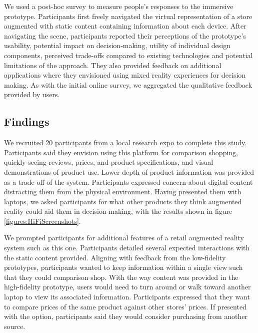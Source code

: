 We used a post-hoc survey to measure people's responses to the immersive prototype. Participants first freely navigated the virtual representation of a store augmented with static content containing information about each device. 
After navigating the scene, participants reported their perceptions of the prototype's usability, potential impact on decision-making, utility of individual design components, perceived trade-offs compared to existing technologies and potential limitations of the approach. They also provided feedback on additional applications where they envisioned using mixed reality experiences for decision making. As with the initial online survey, we aggregated the qualitative feedback provided by users.


\subsection{Findings}
We recruited 20 participants from a local research expo to complete this study. Participants said they envision using this platform for comparison shopping, quickly seeing reviews, prices, and product specifications, and visual demonstrations of product use. Lower depth of product information was provided as a trade-off of the system. Participants expressed concern about digital content distracting them from the physical environment. Having presented them with laptops, we asked participants for what other products they think augmented reality could aid them in decision-making, with the results shown in figure \ref{figures:HiFiScreenshots}.  

We prompted participants for additional features of a retail augmented reality system such as this one. Participants detailed several expected interactions with the static content provided. Aligning with feedback from the low-fidelity prototypes, participants wanted to keep information within a single view such that they could comparison shop. With the way content was provided in the high-fidelity prototype, users would need to turn around or walk toward another laptop to view its associated information. Participants expressed that they want to compare prices of the same product against other stores' prices. If presented with the option, participants said they would consider purchasing from another source.